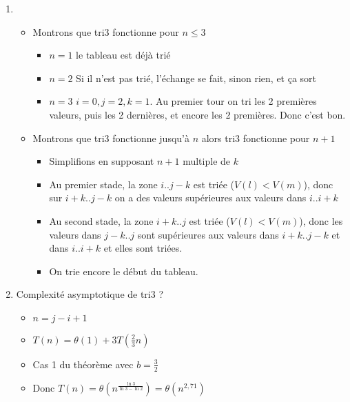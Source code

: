 \begin{enumerate}
	\item 
	\begin{itemize}
		\item Montrons que tri3 fonctionne pour $n\leq 3$
		\begin{itemize}
			\item $n=1$ le tableau est déjà trié
			\item $n=2$ Si il n'est pas trié, l'échange se fait, sinon rien, et ça sort
			\item $n=3$ $i=0,j=2,k=1$. Au premier tour on tri les 2 premières valeurs, puis les 2 dernières, et encore les 2 premières. Donc c'est bon.
		\end{itemize}
		\item Montrons que tri3 fonctionne jusqu'à $n$ alors tri3 fonctionne pour $n+1$
		\begin{itemize}
			\item Simplifions en supposant $n+1$ multiple de $k$
			\item Au premier stade, la zone $i .. j-k$ est triée ($V(l)<V(m)$), donc sur $i+k .. j-k$ on a des valeurs supérieures aux valeurs dans $i .. i+k$ 
			\item Au second stade, la zone $i+k .. j$ est triée ($V(l)<V(m)$), donc les valeurs dans $j-k .. j$ sont supérieures aux valeurs dans $i+k .. j-k$ et dans $i .. i+k$ et elles sont triées.
			\item On trie encore le début du tableau.
		\end{itemize}
	\end{itemize}
	\item Complexité asymptotique de tri3 ? 
	\begin{itemize}
		\item $n = j - i + 1$
		\item $T(n) = \theta(1) + 3T(\frac{2}{3}n)$
		\item Cas 1 du théorème avec $b = \frac{3}{2}$
		\item Donc $T(n) = \theta(n^{\frac{\ln 3}{\ln 3 - \ln 2}}) = \theta(n^{2,71})$
	\end{itemize}
\end{enumerate}

